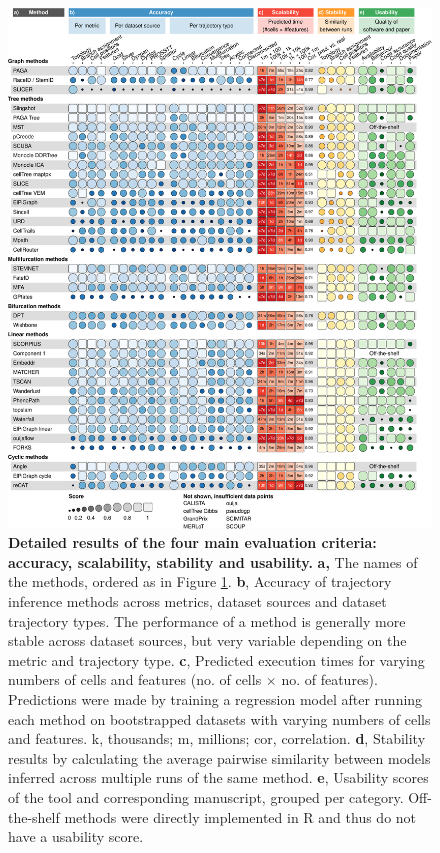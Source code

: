 {{\begin{figure}[tbh!]
{			}
			\label{fig:figure_2}
		\end{figure}
		\clearpage
		\begin{figure}[tbh!]
			\centering\includegraphics[height=.75\textheight]{fig/figure_3.pdf}
			\caption{	
				\textbf{Detailed results of the four main evaluation criteria: accuracy, scalability, stability and usability.}
				\textbf{a,} The names of the methods, ordered as in Figure \ref{fig:figure_2}. \textbf{b}, Accuracy of trajectory inference methods across metrics, dataset sources and dataset trajectory types. The performance of a method is generally more stable across dataset sources, but very variable depending on the metric and trajectory type. \textbf{c}, Predicted execution times for varying numbers of cells and features (no. of cells $\times$ no. of features). Predictions were made by training a regression model after running each method on bootstrapped datasets with varying numbers of cells and features. k, thousands; m, millions; cor, correlation. \textbf{d}, Stability results by calculating the average pairwise similarity between models inferred across multiple runs of the same method. \textbf{e}, Usability scores of the tool and corresponding manuscript, grouped per category. Off-the-shelf methods were directly implemented in R and thus do not have a usability score. 
			}
			\label{fig:figure_3}
		\end{figure}
		\clearpage
	}%
}



